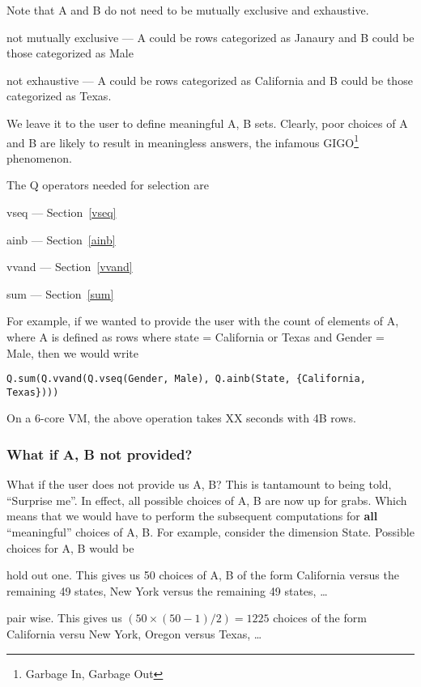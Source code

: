 Note that A and B do not need to be mutually exclusive and exhaustive. 
\bi
\item not mutually exclusive --- 
A could be rows categorized as Janaury and B could be those
categorized as Male
\item not exhaustive  ---
A could be rows categorized as California and B could be those
categorized as Texas. 
\ei

We leave it to the user to define meaningful A, B sets.
Clearly, poor choices of A and B are likely to result in meaningless
answers, the infamous GIGO\footnote{Garbage In, Garbage Out} phenomenon.

The Q operators needed for selection are 
\be
\item vseq --- Section~\ref{vseq}
\item ainb --- Section~\ref{ainb}
\item vvand --- Section~\ref{vvand}
\item sum --- Section~\ref{sum}
\ee

For example, if we wanted to provide the user with the count of elements of A,
where A is defined as rows where state = California or Texas and Gender = Male,
then we would write
\begin{verbatim}
Q.sum(Q.vvand(Q.vseq(Gender, Male), Q.ainb(State, {California, Texas})))
\end{verbatim}
On a 6-core VM, the above operation takes XX seconds with 4B rows.


\subsubsection{What if A, B not provided?}

What if the user does not provide us A, B? This is tantamount to being told,
``Surprise me''. In effect, all possible choices of A, B are now up for grabs.
Which means that we would have to perform the subsequent computations for {\bf
all} ``meaningful'' choices of A, B. For example, consider the dimension State.
Possible choices for A, B would be
\be 
\item  hold out one. This gives us 50 choices of A, B of the form California
versus the remaining 49 states, New York versus the remaining 49 states, \ldots
\item pair wise. This gives us \((50 \times (50-1)/2) = 1225\) choices of the
form California versu New York, Oregon versus Texas, \ldots
\ee

